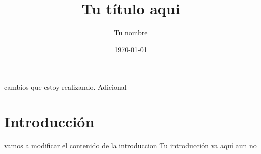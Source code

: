 \documentclass{article}
\title{Tu título aqui}
\author{Tu nombre}
\date{\today}
\begin{document}
\maketitle
cambios que estoy realizando. Adicional
\section{Introducción}
vamos a modificar el contenido de la introduccion
Tu introducción va aquí
aun no
\end{document}

